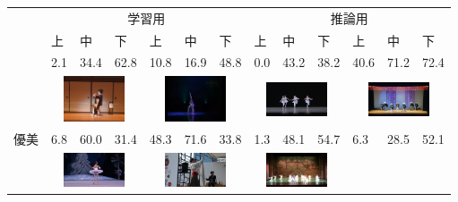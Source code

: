 \begin{table}[t]
  \begin{center}
    \begin{tabular}{|c|p{5mm}p{5mm}p{5mm}|p{5mm}p{5mm}p{5mm}|p{5mm}p{5mm}p{5mm}|p{5mm}p{5mm}p{5mm}|} \hline
        & \multicolumn{6}{|c|}{学習用} & \multicolumn{6}{|c|}{推論用} \\ \cline{2-13}
        &上 &中 &下 &上 &中 &下 &上 &中 &下 &上 &中 &下 \\ \hline
        &2.1 &34.4 &62.8 &10.8 &16.9 &48.8 &0.0 &43.2 &38.2 &40.6 &71.2 &72.4 \\
        & \multicolumn{3}{|c|}{\includegraphics[width=18mm]{images/snaps/japanese_elegant.png}}
        & \multicolumn{3}{|c|}{\includegraphics[width=18mm]{images/snaps/chinese_elegant.png}}
        & \multicolumn{3}{|c|}{\includegraphics[width=18mm]{images/snaps/ballet_group_elegant.png}}
        & \multicolumn{3}{|c|}{\includegraphics[width=18mm]{images/snaps/japanese_group_elegant.png}}
      \\ \cline{2-13}
      優美
        &6.8 &60.0 &31.4 &48.3 &71.6 &33.8 &1.3 &48.1 &54.7 &6.3 &28.5 &52.1 \\
        & \multicolumn{3}{|c|}{\includegraphics[width=18mm]{images/snaps/ballet_elegant.png}}
        & \multicolumn{3}{|c|}{\includegraphics[width=18mm]{images/snaps/thai_elegant.png}}
        & \multicolumn{3}{|c|}{\includegraphics[width=18mm]{images/snaps/chinese_group_elegant.png}}

\end{tabular}
\end{center}
\end{table}
